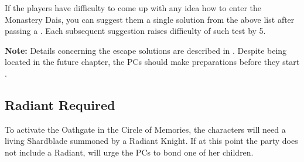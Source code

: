 

If the players have difficulty to come up with any idea how to enter the Monastery Dais, you can suggest them a single solution from the above list after passing a . Each subsequent suggestion raises difficulty of such test by 5.

\textbf{Note:} Details concerning the escape solutions are described in . Despite being located in the future chapter, the PCs should make preparations before they start .





\subsection{Radiant Required}

To activate the Oathgate in the Circle of Memories, the characters will need a living Shardblade summoned by a Radiant Knight. If at this point the party does not include a Radiant, \npcSjaAnat{} will urge the PCs to bond one of her children.
